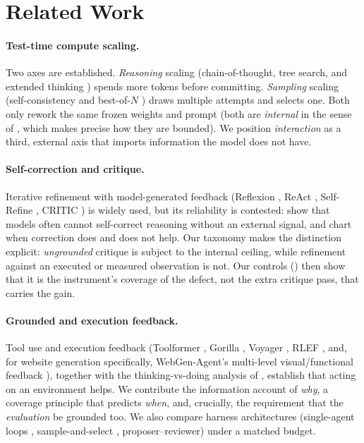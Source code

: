 \section{Related Work}
\label{sec:related}

\paragraph{Test-time compute scaling.} Two axes are established. \emph{Reasoning} scaling (chain-of-thought, tree search, and extended thinking \citep{wei2022chain,yao2023tree,deepseek2025r1,snell2024scaling,kimi2025k15}) spends more tokens before committing. \emph{Sampling} scaling (self-consistency and best-of-$N$ \citep{wang2023selfconsistency,brown2024large}) draws multiple attempts and selects one. Both only rework the same frozen weights and prompt (both are \emph{internal} in the sense of , which makes precise how they are bounded). We position \emph{interaction} as a third, external axis that imports information the model does not have.

\paragraph{Self-correction and critique.} Iterative refinement with model-generated feedback (Reflexion \citep{shinn2023reflexion}, ReAct \citep{yao2023react}, Self-Refine \citep{madaan2023selfrefine}, CRITIC \citep{gou2024critic}) is widely used, but its reliability is contested: \citet{huang2024selfcorrect} show that models often cannot self-correct reasoning without an external signal, and \citet{kamoi2025correct} chart when correction does and does not help. Our taxonomy makes the distinction explicit: \emph{ungrounded} critique is subject to the internal ceiling, while refinement against an executed or measured observation is not. Our controls () then show that it is the instrument's coverage of the defect, not the extra critique pass, that carries the gain.

\paragraph{Grounded and execution feedback.} Tool use and execution feedback (Toolformer \citep{schick2023toolformer}, Gorilla \citep{patil2024gorilla}, Voyager \citep{wang2023voyager}, RLEF \citep{gehring2025rlef}, and, for website generation specifically, WebGen-Agent's multi-level visual/functional feedback \citep{webgen2025}), together with the thinking-vs-doing analysis of \citet{shen2025thinking}, establish that acting on an environment helps. We contribute the information account of \emph{why}, a coverage principle that predicts \emph{when}, and, crucially, the requirement that the \emph{evaluation} be grounded too. We also compare harness architectures (single-agent loops \citep{trankiela2026singleagent}, sample-and-select \citep{ruan2025iad}, proposer--reviewer) under a matched budget.

